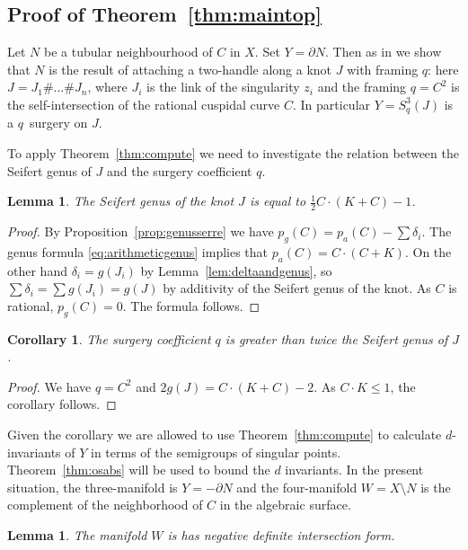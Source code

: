 \documentclass[11pt]{amsart}
\numberwithin{equation}{section}
\theoremstyle{plain}
\newtheorem{lemma}[equation]{Lemma}
\newtheorem{corollary}[equation]{Corollary}
\theoremstyle{definition}
\begin{document}
\subsection{Proof of Theorem~\ref{thm:maintop}}
Let $N$ be a tubular neighbourhood of $C$ in $X$. Set $Y=\partial N$. Then as in \cite[Section 2]{BL} we show that 
$N$ is the result of attaching a two-handle along a knot $J$ with framing $q$: here
$J=J_1\#\ldots\# J_n$, where $J_i$ is the link of the singularity $z_i$ and the framing $q=C^2$ is the self-intersection of the
rational cuspidal curve $C$. In particular $Y=S^3_q(J)$ is a $q$~surgery on $J$.

To apply Theorem~\ref{thm:compute}
we need to investigate the relation between the Seifert genus of $J$
and the surgery coefficient $q$.
\begin{lemma}\label{lem:arith}
The Seifert genus of the knot $J$ is equal to $\frac12C\cdot(K+C)-1$.
\end{lemma}
\begin{proof}
By Proposition~\ref{prop:genusserre} we have $p_g(C)=p_a(C)-\sum\delta_i$. The genus formula \eqref{eq:arithmeticgenus}
implies that $p_a(C)=C\cdot (C+K)$. On the other hand $\delta_i=g(J_i)$ by Lemma~\ref{lem:deltaandgenus},
so $\sum\delta_i=\sum g(J_i)=g(J)$ by additivity of the Seifert genus of the knot. As $C$ is rational, $p_g(C)=0$.  The formula follows.
\end{proof}
\begin{corollary}\label{cor:surgeryislarge}
The surgery coefficient $q$ is greater than twice the Seifert genus of $J$.
\end{corollary}
\begin{proof}
We have $q=C^2$ and $2g(J)=C\cdot(K+C)-2$. As $C\cdot K\le 1$, the corollary follows.
\end{proof}
Given the corollary we are allowed to use Theorem~\ref{thm:compute} to calculate $d$-invariants of $Y$ in terms
of the semigroups of singular points. Theorem~\ref{thm:osabs} will be used 
to bound the $d$ invariants.
In the present situation, the three-manifold is $Y=-\partial N$ 
and the four-manifold $W=X\setminus N$ is the complement of the neighborhood
of $C$ in the algebraic surface.
\begin{lemma}\label{lem:Wisnegative}
The manifold $W$ is has negative definite intersection form.
\end{lemma}
\end{document}
